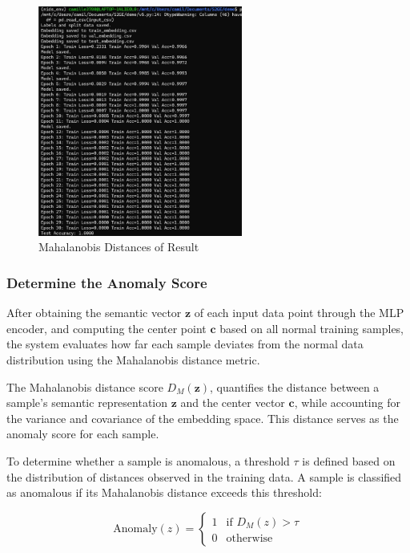 \begin{ZhChapter}
    \begin{figure}[!t]
        \centering
        \includegraphics[width = 0.6\textwidth]{image/V8.jpg}
        \caption{Mahalanobis Distances of Result}
        \label{fig:mh_rs}
    \end{figure}





    \subsubsection{Determine the Anomaly Score}
    After obtaining the semantic vector \(\mathbf{z}\) of each input data point through the MLP encoder, and computing the center point \(\mathbf{c}\) based on all normal training samples, the system evaluates how far each sample deviates from the normal data distribution using the Mahalanobis distance metric.

    The Mahalanobis distance score \(D_M(\mathbf{z})\), quantifies the distance between a sample's semantic representation \(\mathbf{z}\) and the center vector \(\mathbf{c}\), while accounting for the variance and covariance of the embedding space. This distance serves as the anomaly score for each sample.

    To determine whether a sample is anomalous, a threshold \(\tau\) is defined based on the distribution of distances observed in the training data. A sample is classified as anomalous if its Mahalanobis distance exceeds this threshold:

    \begin{equation}
        \text{Anomaly}(z) =
        \begin{cases}
            1 & \text{if } D_M(z) > \tau \\
            0 & \text{otherwise}
        \end{cases}
    \end{equation}


\end{ZhChapter}

